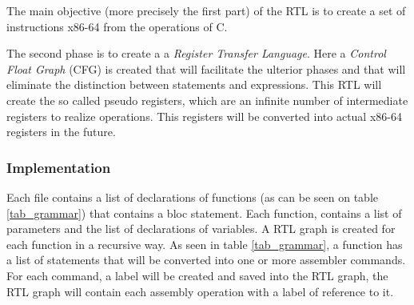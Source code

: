 \documentclass[conference]{IEEEtran}
\theoremstyle{definition}
\begin{document}
The main objective (more precisely the first part) of the RTL is to create a set of instructions x86-64 from the operations of C.

The second phase is to create a a \textit{Register Transfer Language}. Here a \textit{Control Float Graph} (CFG) is created that will facilitate the ulterior phases and that will eliminate the distinction between statements and expressions. This RTL will create the so called pseudo registers, which are an infinite number of intermediate registers to realize operations. This registers will be converted into actual x86-64 registers in the future.

\subsubsection{Implementation}
Each file contains a list of declarations of functions (as can be seen on table \ref{tab_grammar}) that contains a bloc statement. Each function, contains a list of parameters and the list of declarations of variables.
A RTL graph is created for each function in a recursive way. As seen in table \ref{tab_grammar}, a function has a list of statements that will be converted into one or more assembler commands. For each command, a label will be created and saved into the RTL graph, the RTL graph will contain each assembly operation with a label of reference to it.
\end{document}
